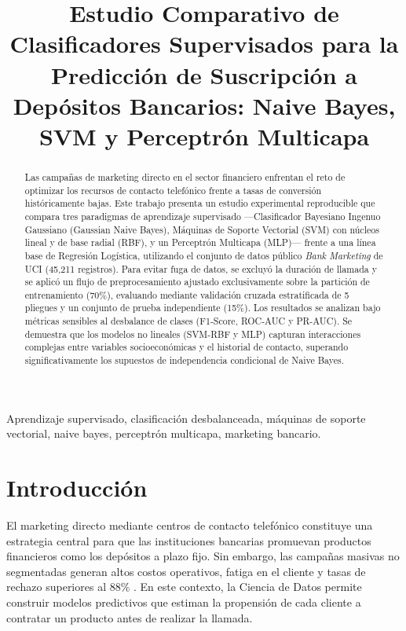 \documentclass[conference]{IEEEtran}
\begin{document}
\title{Estudio Comparativo de Clasificadores Supervisados para la Predicción de Suscripción a Depósitos Bancarios: Naive Bayes, SVM y Perceptrón Multicapa}

\author{
}

\maketitle

\begin{abstract}
Las campañas de marketing directo en el sector financiero enfrentan el reto de optimizar los recursos de contacto telefónico frente a tasas de conversión históricamente bajas. Este trabajo presenta un estudio experimental reproducible que compara tres paradigmas de aprendizaje supervisado ---Clasificador Bayesiano Ingenuo Gaussiano (Gaussian Naive Bayes), Máquinas de Soporte Vectorial (SVM) con núcleos lineal y de base radial (RBF), y un Perceptrón Multicapa (MLP)--- frente a una línea base de Regresión Logística, utilizando el conjunto de datos público \textit{Bank Marketing} de UCI (45,211 registros). Para evitar fuga de datos, se excluyó la duración de llamada y se aplicó un flujo de preprocesamiento ajustado exclusivamente sobre la partición de entrenamiento (70\%), evaluando mediante validación cruzada estratificada de 5 pliegues y un conjunto de prueba independiente (15\%). Los resultados se analizan bajo métricas sensibles al desbalance de clases (F1-Score, ROC-AUC y PR-AUC). Se demuestra que los modelos no lineales (SVM-RBF y MLP) capturan interacciones complejas entre variables socioeconómicas y el historial de contacto, superando significativamente los supuestos de independencia condicional de Naive Bayes.
\end{abstract}

\begin{IEEEkeywords}
Aprendizaje supervisado, clasificación desbalanceada, máquinas de soporte vectorial, naive bayes, perceptrón multicapa, marketing bancario.
\end{IEEEkeywords}

\section{Introducción}
El marketing directo mediante centros de contacto telefónico constituye una estrategia central para que las instituciones bancarias promuevan productos financieros como los depósitos a plazo fijo. Sin embargo, las campañas masivas no segmentadas generan altos costos operativos, fatiga en el cliente y tasas de rechazo superiores al 88\% \cite{moro2014}. En este contexto, la Ciencia de Datos permite construir modelos predictivos que estiman la propensión de cada cliente a contratar un producto antes de realizar la llamada.
\end{document}
